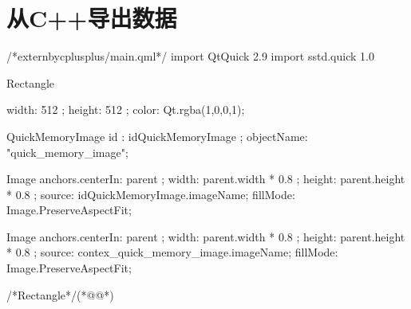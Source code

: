 ﻿




\FloatBarrier
\section{
从C{\sourcefonttwo{}+}{\sourcefonttwo{}+}导出数据
}\label{s100810t01}


\label{f000081}    %
\FloatBarrier                                  %
\begin{thebookfilesourceone}[escapeinside={(*@}{@*)},
caption=GoodLuck,
title=\filesourcenumbernameone \thefilesourcenumber
]
/*externbycplusplus/main.qml*/
import QtQuick 2.9
import sstd.quick 1.0

Rectangle{

    width: 512 ;
    height: 512 ;
    color: Qt.rgba(1,0,0,1);

    QuickMemoryImage{
        id : idQuickMemoryImage ;
        objectName: "quick_memory_image";
    }

    Image {
        anchors.centerIn: parent ;
        width: parent.width * 0.8 ;
        height: parent.height * 0.8 ;
        source: idQuickMemoryImage.imageName;
        fillMode: Image.PreserveAspectFit;
    }

    Image {
        anchors.centerIn: parent ;
        width: parent.width * 0.8 ;
        height: parent.height * 0.8 ;
        source: contex_quick_memory_image.imageName;
        fillMode: Image.PreserveAspectFit;
    }

}/*Rectangle*/(*@\marginpar[\hfill\setlength\fboxsep{2pt}\fbox{\footnotesize{\kaishu\parbox{1em}{\setlength{\baselineskip}{2pt}\filesourcenumbernameone}}\footnotesize{\thefilesourcenumber}}]{\setlength\fboxsep{2pt}\fbox{\footnotesize{\kaishu\parbox{1em}{\setlength{\baselineskip}{2pt}\filesourcenumbernameone}}\footnotesize{\thefilesourcenumber}}}@*)\end{thebookfilesourceone}          %
\addtocounter{lstlisting}{-1}   %



